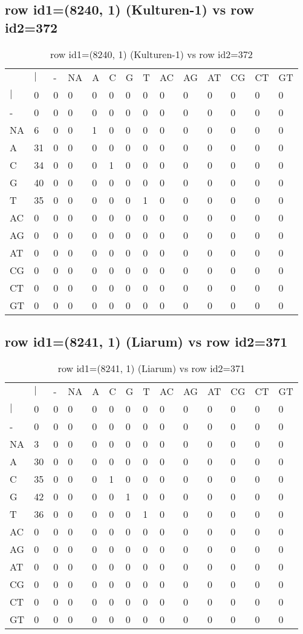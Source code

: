 \subsection{row id1=(8240, 1) (Kulturen-1) vs row id2=372}
\begin{center}
\begin{longtable}{|l|l|l|l|l|l|l|l|l|l|l|l|l|l|}
\caption{row id1=(8240, 1) (Kulturen-1) vs row id2=372} \label{table_dm366}\\
\hline
\\
\hline
&$|$&-&NA&A&C&G&T&AC&AG&AT&CG&CT&GT\\
$|$&0&0&0&0&0&0&0&0&0&0&0&0&0\\
-&0&0&0&0&0&0&0&0&0&0&0&0&0\\
NA&6&0&0&1&0&0&0&0&0&0&0&0&0\\
A&31&0&0&0&0&0&0&0&0&0&0&0&0\\
C&34&0&0&0&1&0&0&0&0&0&0&0&0\\
G&40&0&0&0&0&0&0&0&0&0&0&0&0\\
T&35&0&0&0&0&0&1&0&0&0&0&0&0\\
AC&0&0&0&0&0&0&0&0&0&0&0&0&0\\
AG&0&0&0&0&0&0&0&0&0&0&0&0&0\\
AT&0&0&0&0&0&0&0&0&0&0&0&0&0\\
CG&0&0&0&0&0&0&0&0&0&0&0&0&0\\
CT&0&0&0&0&0&0&0&0&0&0&0&0&0\\
GT&0&0&0&0&0&0&0&0&0&0&0&0&0\\
\hline
\end{longtable}
\end{center}

\subsection{row id1=(8241, 1) (Liarum) vs row id2=371}
\begin{center}
\begin{longtable}{|l|l|l|l|l|l|l|l|l|l|l|l|l|l|}
\caption{row id1=(8241, 1) (Liarum) vs row id2=371} \label{table_dm368}\\
\hline
\\
\hline
&$|$&-&NA&A&C&G&T&AC&AG&AT&CG&CT&GT\\
$|$&0&0&0&0&0&0&0&0&0&0&0&0&0\\
-&0&0&0&0&0&0&0&0&0&0&0&0&0\\
NA&3&0&0&0&0&0&0&0&0&0&0&0&0\\
A&30&0&0&0&0&0&0&0&0&0&0&0&0\\
C&35&0&0&0&1&0&0&0&0&0&0&0&0\\
G&42&0&0&0&0&1&0&0&0&0&0&0&0\\
T&36&0&0&0&0&0&1&0&0&0&0&0&0\\
AC&0&0&0&0&0&0&0&0&0&0&0&0&0\\
AG&0&0&0&0&0&0&0&0&0&0&0&0&0\\
AT&0&0&0&0&0&0&0&0&0&0&0&0&0\\
CG&0&0&0&0&0&0&0&0&0&0&0&0&0\\
CT&0&0&0&0&0&0&0&0&0&0&0&0&0\\
GT&0&0&0&0&0&0&0&0&0&0&0&0&0\\
\hline
\end{longtable}
\end{center}

